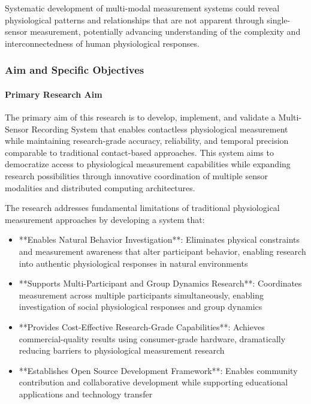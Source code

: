 \documentclass[11pt,a4paper]{article}
\begin{document}
Systematic development of multi-modal measurement systems could reveal physiological
patterns and relationships that are
not apparent through single-sensor measurement, potentially advancing understanding
of the complexity and
interconnectedness of human physiological responses.

\subsubsection{Aim and Specific Objectives}

\paragraph{Primary Research Aim}

The primary aim of this research is to develop, implement, and validate a
Multi-Sensor Recording System
that enables contactless physiological measurement while maintaining research-grade
accuracy, reliability, and temporal
precision comparable to traditional contact-based approaches.  This system aims to
democratize access to
physiological measurement capabilities while expanding research possibilities through
innovative coordination of
multiple sensor modalities and distributed computing architectures.

The research addresses fundamental limitations of traditional physiological
measurement approaches by developing a
system that:

\begin{itemize}
\item **Enables Natural Behavior Investigation**: Eliminates physical constraints and measurement awareness that alter
  participant behavior, enabling research into authentic physiological responses in
  natural environments
\item **Supports Multi-Participant and Group Dynamics Research**: Coordinates measurement across multiple participants
  simultaneously, enabling investigation of social physiological responses and group
  dynamics
\item **Provides Cost-Effective Research-Grade Capabilities**: Achieves commercial-quality results using consumer-grade
  hardware, dramatically reducing barriers to physiological measurement
  research
\item **Establishes Open Source Development Framework**: Enables community contribution and collaborative development while
  supporting educational applications and technology transfer

\end{itemize}
\end{document}
